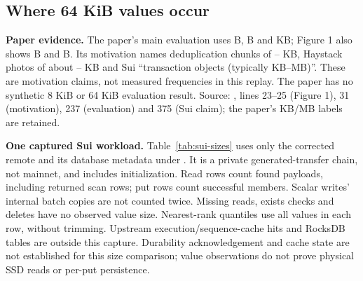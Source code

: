 \clearpage
\subsection{Where 64 KiB values occur}\label{sec:value-sizes}
\textbf{Paper evidence.} The paper's main evaluation uses  B,  B and  KB; Figure 1 also shows  B and  B. Its motivation names deduplication chunks of -- KB, Haystack photos of about -- KB and Sui ``transaction objects (typically KB--MB)''. These are motivation claims, not measured frequencies in this replay. The paper has no synthetic 8 KiB or 64 KiB evaluation result. Source: , lines 23--25 (Figure 1), 31 (motivation), 237 (evaluation) and 375 (Sui claim); the paper's KB/MB labels are retained.

\textbf{One captured Sui workload.} Table~\ref{tab:sui-sizes} uses only the corrected remote  and its database metadata under . It is a private generated-transfer chain, not mainnet, and includes initialization. Read rows count found payloads, including returned scan rows; put rows count successful members. Scalar writes' internal batch copies are not counted twice. Missing reads, exists checks and deletes have no observed value size. Nearest-rank quantiles use all values in each row, without trimming. Upstream execution/sequence-cache hits and RocksDB tables are outside this capture. Durability acknowledgement and cache state are not established for this size comparison; value observations do not prove physical SSD reads or per-put persistence.

\begin{table}[H]\centering{}
\caption{Observed value bytes in one corrected remote Sui capture. Each threshold count and share uses its row's population, not API calls. ``All tables'' includes the small metadata tables omitted above. Empty populations have no quantile or percentage. Full contents means \texttt{full\_checkpoint\_content\_v2}; other displayed names map directly to \texttt{sui-value-sizes.csv}. One run only; read/write populations remain separate; cache and durability qualification are not established.}\label{tab:sui-sizes}
\end{table}

